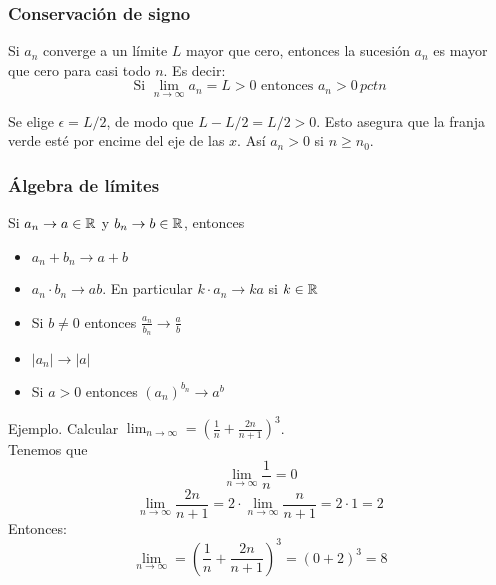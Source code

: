 \documentclass[../Teoría.root.tex]{subfiles}
\begin{document}
\subsubsection{Conservación de signo}
Si \(a_n\) converge a un límite \(L\) mayor que cero, entonces la sucesión \(a_n\) es mayor que cero para casi todo \(n\).
Es decir:
\[\text{Si }\lim_{n\to\infty}a_n=L>0\text{ entonces }a_n>0\,pctn\]
\begin{center}
    \begin{scaletikzpicturetowidth}{.5\linewidth}
    \end{scaletikzpicturetowidth}
\end{center}
Se elige \(\epsilon=L/2\), de modo que \(L-L/2=L/2>0\).
Esto asegura que la franja verde esté por encime del eje de las \(x\).
Así \(a_n>0\) si \(n\geq n_0\).
\subsubsection{Álgebra de límites}
Si \(a_n\rightarrow a\in\mathbb{R}\) y \(b_n\rightarrow b\in\mathbb{R}\), entonces
\begin{itemize}
    \item \(a_n+b_n\rightarrow a+b\)
    \item \(a_n\cdot b_n\rightarrow ab\).
          En particular \(k\cdot a_n\rightarrow ka\) si \(k\in\mathbb{R}\)
    \item Si \(b\neq0\) entonces \(\frac{a_n}{b_n}\rightarrow\frac{a}{b}\)
    \item \(|a_n|\rightarrow|a|\)
    \item Si \(a>0\) entonces \((a_n)^{b_n}\rightarrow a^b\)
\end{itemize}
Ejemplo.
Calcular \(\lim_{n\to\infty}=\left(\frac{1}{n}+\frac{2n}{n+1}\right)^3\).\\
Tenemos que \[\lim_{n\to\infty}\frac{1}{n}=0\] \[\lim_{n\to\infty}\frac{2n}{n+1}=2\cdot\lim_{n\to\infty}\frac{n}{n+1}=2\cdot1=2\]
Entonces:
\[\lim_{n\to\infty}=\left(\frac{1}{n}+\frac{2n}{n+1}\right)^3=(0+2)^3=8\]
\end{document}
